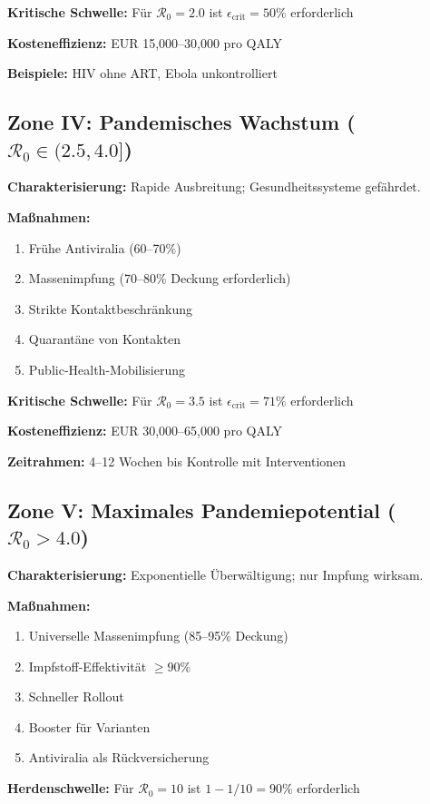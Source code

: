 ﻿\documentclass[a4paper,12pt,twoside]{article}
\theoremstyle{definition}
\begin{document}
\textbf{Kritische Schwelle:} Für $\mathcal{R}_0 = 2.0$ ist $\epsilon_{\text{crit}} = 50\%$ erforderlich

\textbf{Kosteneffizienz:} EUR 15,000--30,000 pro QALY

\textbf{Beispiele:} HIV ohne ART, Ebola unkontrolliert

\subsection{Zone IV: Pandemisches Wachstum ($\mathcal{R}_0 \in (2.5, 4.0]$)}

\textbf{Charakterisierung:} Rapide Ausbreitung; Gesundheitssysteme gefährdet.

\textbf{Maßnahmen:}
\begin{enumerate}
\item Frühe Antiviralia (60--70\%)
\item Massenimpfung (70--80\% Deckung erforderlich)
\item Strikte Kontaktbeschränkung
\item Quarantäne von Kontakten
\item Public-Health-Mobilisierung
\end{enumerate}

\textbf{Kritische Schwelle:} Für $\mathcal{R}_0 = 3.5$ ist $\epsilon_{\text{crit}} = 71\%$ erforderlich

\textbf{Kosteneffizienz:} EUR 30,000--65,000 pro QALY

\textbf{Zeitrahmen:} 4--12 Wochen bis Kontrolle mit Interventionen

\subsection{Zone V: Maximales Pandemiepotential ($\mathcal{R}_0 > 4.0$)}

\textbf{Charakterisierung:} Exponentielle Überwältigung; nur Impfung wirksam.

\textbf{Maßnahmen:}
\begin{enumerate}
\item Universelle Massenimpfung (85--95\% Deckung)
\item Impfstoff-Effektivität $\geq 90\%$
\item Schneller Rollout
\item Booster für Varianten
\item Antiviralia als Rückversicherung
\end{enumerate}

\textbf{Herdenschwelle:} Für $\mathcal{R}_0 = 10$ ist $1 - 1/10 = 90\%$ erforderlich
\end{document}
